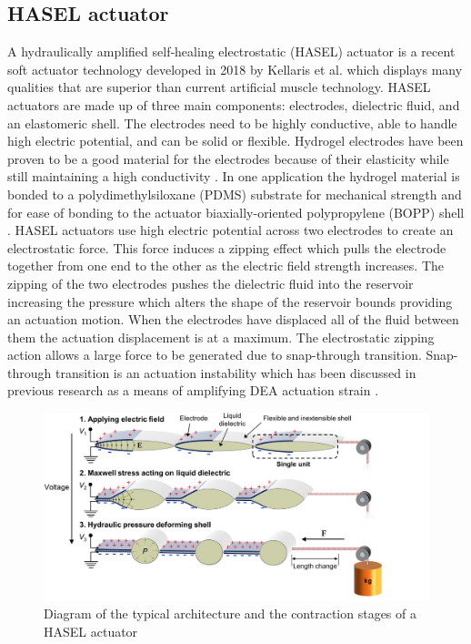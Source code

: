 \subsection{HASEL actuator}
A hydraulically amplified self‐healing electrostatic (HASEL) actuator is a recent soft actuator technology developed in 2018 by Kellaris et al. \citep{Kellaris2018} which displays many qualities that are superior than current artificial muscle technology. HASEL actuators are made up of three main components: electrodes, dielectric fluid, and an elastomeric shell. The electrodes need to be highly conductive, able to handle high electric potential, and can be solid or flexible. Hydrogel electrodes have been proven to be a good material for the electrodes because of their elasticity while still maintaining a high conductivity \citep{Acome2018}. In one application the hydrogel material is bonded to a polydimethylsiloxane (PDMS) substrate for mechanical strength and for ease of bonding to the actuator biaxially-oriented polypropylene (BOPP) shell \citep{Kellaris2018,Yuk2016}. HASEL actuators use high electric potential across two electrodes to create an electrostatic force. This force induces a zipping effect which pulls the electrode together from one end to the other as the electric field strength increases. The zipping of the two electrodes pushes the dielectric fluid into the reservoir increasing the pressure which alters the shape of the reservoir bounds providing an actuation motion. When the electrodes have displaced all of the fluid between them the actuation displacement is at a maximum. The electrostatic zipping action allows a large force to be generated due to snap-through transition. Snap-through transition is an actuation instability which has been discussed in previous research as a means of amplifying DEA actuation strain \citep{Keplinger2012}. 
\begin{figure}[H]
  \centering
  \includegraphics[width=0.7\linewidth]{Figures/HASEL_actuator_crop.jpg}
  \caption{Diagram of the typical architecture and the contraction stages of a HASEL actuator \citep{Kellaris2018}}
  \label{fig:Artificial Muscle_HASEL}
\end{figure}
